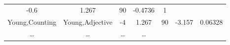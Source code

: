 \documentclass[]{article}
\theoremstyle{definition}
\theoremstyle{definition}
\theoremstyle{definition}
\theoremstyle{remark}
\begin{document}
\begin{longtable}[]{@{}ccccccc@{}}
\begin{minipage}[t]{0.10\columnwidth}
-0.6\strut
\end{minipage} & \begin{minipage}[t]{0.11\columnwidth}\centering\strut
1.267\strut
\end{minipage} & \begin{minipage}[t]{0.05\columnwidth}\centering\strut
90\strut
\end{minipage} & \begin{minipage}[t]{0.11\columnwidth}\centering\strut
-0.4736\strut
\end{minipage} & \begin{minipage}[t]{0.11\columnwidth}\centering\strut
1\strut
\end{minipage}\tabularnewline
\begin{minipage}[t]{0.16\columnwidth}\centering\strut
Young,Counting\strut
\end{minipage} & \begin{minipage}[t]{0.16\columnwidth}\centering\strut
Young,Adjective\strut
\end{minipage} & \begin{minipage}[t]{0.10\columnwidth}\centering\strut
-4\strut
\end{minipage} & \begin{minipage}[t]{0.11\columnwidth}\centering\strut
1.267\strut
\end{minipage} & \begin{minipage}[t]{0.05\columnwidth}\centering\strut
90\strut
\end{minipage} & \begin{minipage}[t]{0.11\columnwidth}\centering\strut
-3.157\strut
\end{minipage} & \begin{minipage}[t]{0.11\columnwidth}\centering\strut
0.06328\strut
\end{minipage}\tabularnewline
\begin{minipage}[t]{0.16\columnwidth}\centering\strut
\ldots{}\strut
\end{minipage} & \begin{minipage}[t]{0.16\columnwidth}\centering\strut
\ldots{}\strut
\end{minipage} & \begin{minipage}[t]{0.10\columnwidth}\centering\strut
\ldots{}\strut
\end{minipage} & \begin{minipage}[t]{0.11\columnwidth}\centering\strut
\ldots{}\strut
\end{minipage} & \begin{minipage}[t]{0.05\columnwidth}\centering\strut

\end{minipage}
\end{longtable}
\end{document}
